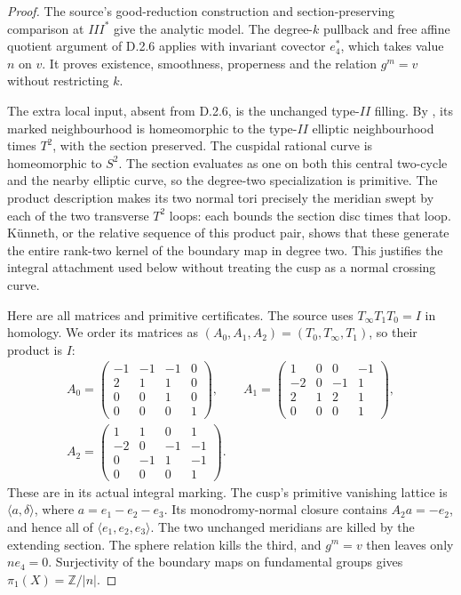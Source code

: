 \begin{proof}
The source's good-reduction construction and section-preserving
comparison at $III^*$ give the analytic model. The degree-$k$
pullback and free affine quotient argument of D.2.6 applies
with invariant covector $e_4^*$, which takes value $n$ on $v$.
It proves existence, smoothness, properness and the relation
$g^m=v$ without restricting $k$.

The extra local input, absent from D.2.6, is the unchanged
type-$II$ filling. By \cite[Lemma 3.10, Proposition 3.11]{manLR26},
its marked neighbourhood is homeomorphic to the type-$II$
elliptic neighbourhood times $T^2$, with the section preserved.
The cuspidal rational curve is homeomorphic to $S^2$.
The section evaluates as one on both this central two-cycle
and the nearby elliptic curve, so the degree-two specialization
is primitive. The product description makes its two normal
tori precisely the meridian swept by each of the two transverse
$T^2$ loops: each bounds the section disc times that loop.
K\"unneth, or the relative sequence of this product pair,
shows that these generate the entire rank-two kernel of
the boundary map in degree two. This justifies the integral
attachment used below without treating the cusp as a normal
crossing curve.

Here are all matrices and primitive certificates. The source
uses $T_\infty T_1T_0=I$ in homology. We order its matrices
as $(A_0,A_1,A_2)=(T_0,T_\infty,T_1)$, so their product is $I$:
\[
 \begin{gathered}
 A_0=\begin{pmatrix}-1&-1&-1&0\\2&1&1&0\\0&0&1&0\\0&0&0&1\end{pmatrix},\qquad
 A_1=\begin{pmatrix}1&0&0&-1\\-2&0&-1&1\\2&1&2&1\\0&0&0&1\end{pmatrix},\\
 A_2=\begin{pmatrix}1&1&0&1\\-2&0&-1&-1\\0&-1&1&-1\\0&0&0&1\end{pmatrix}.
 \end{gathered}
\]
These are \cite[Proposition 3.13]{manLR26} in its actual
integral marking. The cusp's primitive vanishing lattice is
$\langle a,\delta\rangle$, where $a=e_1-e_2-e_3$.
Its monodromy-normal closure contains
$A_2a=-e_2$, and hence all of
$\langle e_1,e_2,e_3\rangle$. The two unchanged meridians
are killed by the extending section. The sphere relation kills
the third, and $g^m=v$ then leaves only $ne_4=0$.
Surjectivity of the boundary maps on fundamental groups gives
$\pi_1(X)=\mathbb Z/|n|$.


\end{proof}
